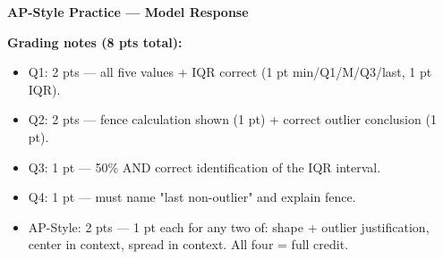 \documentclass[10pt]{article}
\begin{document}
\vspace{0.18in}

\begin{tcolorbox}[colback=redbg, colframe=redacc, boxrule=0.8pt, arc=2mm,
    left=4mm, right=4mm, top=3mm, bottom=3mm]
\small\textbf{AP-Style Practice --- Model Response}\\[6pt]
\end{tcolorbox}

\begin{teachernote}
\textbf{Grading notes (8 pts total):}
\begin{itemize}[itemsep=2pt]
  \item Q1: 2 pts — all five values + IQR correct (1 pt min/Q1/M/Q3/last, 1 pt IQR).
  \item Q2: 2 pts — fence calculation shown (1 pt) + correct outlier conclusion (1 pt).
  \item Q3: 1 pt — 50\% AND correct identification of the IQR interval.
  \item Q4: 1 pt — must name "last non-outlier" and explain fence.
  \item AP-Style: 2 pts — 1 pt each for any two of: shape + outlier justification, center in context, spread in context. All four = full credit.
\end{itemize}
\end{teachernote}
\end{document}
